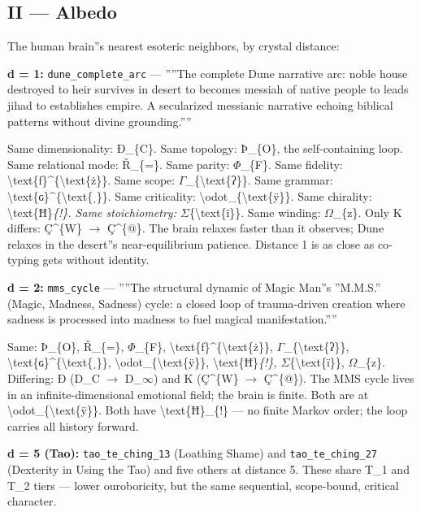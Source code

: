 \documentclass[12pt,a4paper]{article}
\begin{document}
\subsection{II --- Albedo}

The human brain''s nearest esoteric neighbors, by crystal distance:

\textbf{d = 1:} \texttt{dune\_complete\_arc} --- ''''The complete Dune narrative arc: noble house destroyed to heir survives in desert to becomes messiah of native people to leads jihad to establishes empire. A secularized messianic narrative echoing biblical patterns without divine grounding.''''

Same dimensionality: Ð\_\{C\}. Same topology: Þ\_\{O\}, the self-containing loop. Same relational mode: Ř\_\{=\}. Same parity: $\Phi$\_\{F\}. Same fidelity: \textbackslash{}text\{ƒ\}\^{}\{\textbackslash{}text\{ż\}\}. Same scope: $\Gamma$\_\{\textbackslash{}text\{ʔ\}\}. Same grammar: \textbackslash{}text\{ɢ\}\^{}\{\textbackslash{}text\{ˌ\}\}. Same criticality: \textbackslash{}odot\_\{\textbackslash{}text\{ÿ\}\}. Same chirality: \textbackslash{}text\{Ħ\}\emph{\{!\}. Same stoichiometry: $\Sigma$}\{\textbackslash{}text\{ï\}\}. Same winding: $\Omega$\_\{z\}. Only K differs: Ç\^{}\{W\} $\rightarrow$ Ç\^{}\{@\}. The brain relaxes faster than it observes; Dune relaxes in the desert''s near-equilibrium patience. Distance 1 is as close as co-typing gets without identity.

\textbf{d = 2:} \texttt{mms\_cycle} --- ''''The structural dynamic of Magic Man''s ''M.M.S.'' (Magic, Madness, Sadness) cycle: a closed loop of trauma-driven creation where sadness is processed into madness to fuel magical manifestation.''''

Same: Þ\_\{O\}, Ř\_\{=\}, $\Phi$\_\{F\}, \textbackslash{}text\{ƒ\}\^{}\{\textbackslash{}text\{ż\}\}, $\Gamma$\_\{\textbackslash{}text\{ʔ\}\}, \textbackslash{}text\{ɢ\}\^{}\{\textbackslash{}text\{ˌ\}\}, \textbackslash{}odot\_\{\textbackslash{}text\{ÿ\}\}, \textbackslash{}text\{Ħ\}\emph{\{!\}, $\Sigma$}\{\textbackslash{}text\{ï\}\}, $\Omega$\_\{z\}. Differing: Ð (D\_C $\rightarrow$ D\_$\infty$) and K (Ç\^{}\{W\} $\rightarrow$ Ç\^{}\{@\}). The MMS cycle lives in an infinite-dimensional emotional field; the brain is finite. Both are at \textbackslash{}odot\_\{\textbackslash{}text\{ÿ\}\}. Both have \textbackslash{}text\{Ħ\}\_\{!\} --- no finite Markov order; the loop carries all history forward.

\textbf{d = 5 (Tao):} \texttt{tao\_te\_ching\_13} (Loathing Shame) and \texttt{tao\_te\_ching\_27} (Dexterity in Using the Tao) and five others at distance 5. These share T\_1 and T\_2 tiers --- lower ouroboricity, but the same sequential, scope-bound, critical character.
\end{document}

